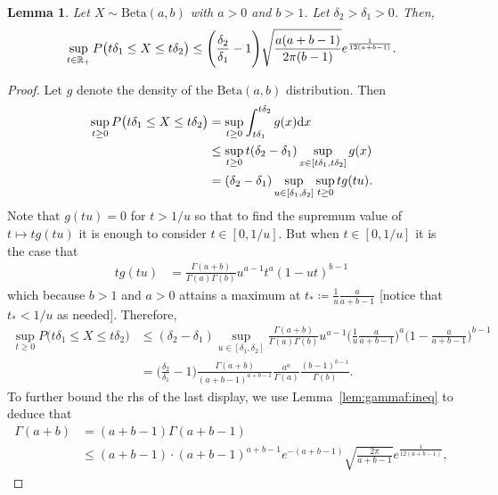 \documentclass{article}
\newtheorem{lemma}{Lemma}
\newcommand{\1}{\boldsymbol{1}}
\newcommand{\betaDist}{\mathrm{Beta}}
\theoremstyle{plain}
\begin{document}
\begin{lemma}
  \label{lem:beta-bayes}
  Let $X \sim \betaDist(a,b)$ with $a > 0$ and $b > 1$. Let $\delta_2> \delta_1 > 0$. Then,
  \begin{equation*}
    \sup_{t\in \mathbb{R}_{+}}P\big(t\delta_1 \leq X \leq t\delta_2 \big) \leq \Bigg(\frac{\delta_2}{\delta_1} - 1 \Bigg)\sqrt{\frac{a(a + b-1)}{2\pi(b-1)}}e^{\frac{1}{12(a+b-1)}}.
  \end{equation*}
\end{lemma}%
\begin{proof}
  Let $g$ denote the density of the $\betaDist(a,b)$ distribution. Then
  \begin{align*}
    \sup_{t\geq 0 }P\big(t\delta_1 \leq X \leq t\delta_2 \big)
    &= \sup_{t\geq 0}\int_{t\delta_1}^{t\delta_2}g(x)\mathrm{d} x\\
    &\leq \sup_{t\geq 0} t(\delta_2 - \delta_1)\sup_{x \in [t\delta_1,t\delta_2]}g(x)\\
    &= (\delta_2 - \delta_1) \sup_{u\in [\delta_1,\delta_2]} \sup_{t \geq 0} t g(t u).
  \end{align*}
  Note that $g(tu) = 0$ for $t > 1/u$ so that to find the supremum value of $t\mapsto tg(t u)$ it is enough to consider $t \in [0,1/u]$. But when $t \in [0,1/u]$ it is the case that
  \begin{align*}
    t g(t u)%
    &= \frac{\Gamma(a+b)}{\Gamma(a)\Gamma(b)} u^{a-1} t^{a}(1- u t)^{b-1}
  \end{align*}
  which because $b > 1$ and $a > 0$ attains a maximum at $t_{*} \coloneqq \frac{1}{u}\frac{a}{a + b -1}$ [notice that $t_{*} < 1/u$ as needed]. Therefore,
  \begin{align*}
    \sup_{t\geq 0}P\big(t\delta_1 \leq X \leq t\delta_2 \big)%
    &\leq (\delta_2 - \delta_1) \sup_{u\in [\delta_1,\delta_2]} \frac{\Gamma(a+b)}{\Gamma(a)\Gamma(b)} u^{a-1}\Big(\frac{1}{u}\frac{a}{a + b -1} \Big)^{a}\Big(1 - \frac{a}{a+b -1}\Big)^{b-1}\\
    &=\Big(\frac{\delta_2}{\delta_1} - 1\Big) \frac{\Gamma(a+b)}{(a+b-1)^{a+b-1}}\frac{a^{a}}{\Gamma(a)}\frac{(b-1)^{b-1}}{\Gamma(b)}.
  \end{align*}
  To further bound the rhs of the last display, we use Lemma~\ref{lem:gammaf:ineq} to deduce that
  \begin{align*}
    \Gamma(a+b)%
    &= (a+b - 1)\Gamma(a+b-1)\\
    &\leq (a+b-1) \cdot (a+b-1)^{a+b-1}e^{-(a+b-1)}\sqrt{\frac{2\pi}{a+b-1}}e^{\frac{1}{12(a+b-1)}},
  \end{align*}

\end{proof}
\end{document}
